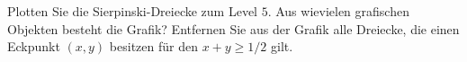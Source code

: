 \begin{aufg}[0]
Plotten Sie die Sierpinski-Dreiecke zum Level $5$. Aus wievielen grafischen
Objekten besteht die Grafik? Entfernen Sie aus der Grafik alle Dreiecke, die einen Eckpunkt $(x,y)$
besitzen f\"ur den $x+y \geq 1/2$ gilt.
\end{aufg}
